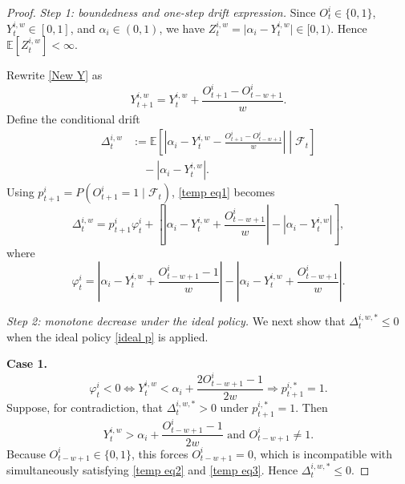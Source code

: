 \documentclass[a4paper,fleqn]{cas-dc}
\theoremstyle{plain}
\theoremstyle{remark}
\theoremstyle{plain}
\begin{document}
\begin{proof}
\textit{Step 1: boundedness and one-step drift expression.} Since $O_t^i \in \{0,1\}$, $Y_t^{i,w} \in [0,1]$, and $\alpha_i \in (0,1)$, we have $Z_t^{i,w} = \vert \alpha_i - Y_t^{i,w} \vert \in [0,1)$. Hence $\mathbb{E}\left[Z_t^{i,w}\right] < \infty$.

Rewrite \eqref{New Y} as
\begin{equation} \label{New Y t+1}
    Y_{t+1}^{i,w} = Y_{t}^{i,w} + \frac{O_{t+1}^i - O_{t-w+1}^i}{w}.
\end{equation}
Define the conditional drift
\begin{equation}\label{temp eq1}
\begin{aligned}\Delta_t^{i,w}
&:= \mathbb{E}\!\left[
\left|\alpha_i - Y_t^{i,w} - \frac{O_{t+1}^i - O_{t-w+1}^i}{w}\right|
\middle| \mathcal{F}_t
\right]
\\ &\quad-\left|\alpha_i-Y_t^{i,w}\right|.
\end{aligned}
\end{equation}
Using $p_{t+1}^i=P(O_{t+1}^i=1\mid\mathcal{F}_t)$, \eqref{temp eq1} becomes
\begin{equation} \label{Delta i}
    \Delta_t^{i,w}
    = p_{t+1}^i \varphi_{t}^i + \left[
    \left|\alpha_i - Y_t^{i,w} + \frac{O_{t-w+1}^i}{w}\right|
    - \left|\alpha_i - Y_t^{i,w} \right|
    \right],
\end{equation}
where
\begin{equation}\label{varphi i}
    \varphi_{t}^i =
    \left|\alpha_i - Y_t^{i,w} + \frac{O_{t-w+1}^i-1}{w} \right|
    -\left|\alpha_i - Y_t^{i,w} + \frac{O_{t-w+1}^i}{w} \right|.
\end{equation}

\textit{Step 2: monotone decrease under the ideal policy.} We next show that $\Delta_t^{i,w,*}\le 0$ when the ideal policy \eqref{ideal p} is applied.

\textbf{Case 1.}
\begin{equation}\label{temp eq2}
    \varphi_t^i < 0 \Leftrightarrow Y_{t}^{i,w} < \alpha_i + \dfrac{2O^{i}_{t-w+1}-1}{2w}
    \Rightarrow p_{t+1}^{i,*} = 1.
\end{equation}
Suppose, for contradiction, that $\Delta_t^{i,w,*} > 0$ under $p_{t+1}^{i,*} = 1$. Then
\begin{equation}\label{temp eq3}
    Y_t^{i,w} > \alpha_i + \frac{O_{t-w+1}^i-1}{2w} \text{ and } O_{t-w+1}^i \neq 1.
\end{equation}
Because $O_{t-w+1}^i \in \{0,1\}$, this forces $O_{t-w+1}^i = 0$, which is incompatible with simultaneously satisfying \eqref{temp eq2} and \eqref{temp eq3}. Hence $\Delta_t^{i,w,*} \leq 0$.


\end{proof}
\end{document}
